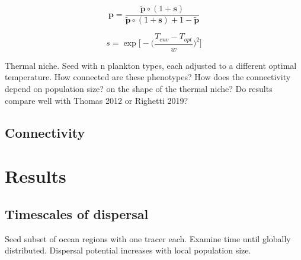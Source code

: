 \documentclass[12pt]{article}
\begin{document}
\begin{equation}
\label{ }
\mathbf{p} = \frac{\mathbf{\tilde{p}} \circ (1+\mathbf{s}) } {\mathbf{\tilde{p}} \circ (1+\mathbf{s}) + 1 -\mathbf{\tilde{p}}}
\end{equation}

\begin{equation}
s = \exp\bigg[-\Big(\frac{T_{env}-T_{opt}}{w}\Big)^2\bigg]
\end{equation}





Thermal niche. Seed with n plankton types, each adjusted to a different optimal temperature. How connected are these phenotypes? How does the connectivity depend on population size? on the shape of the thermal niche? Do results compare well with Thomas 2012 or Righetti 2019?







\subsection{Connectivity}






\section{Results}

\subsection{Timescales of dispersal}

Seed subset of ocean regions with one tracer each. Examine time until globally distributed. Dispersal potential increases with local population size.
\end{document}
